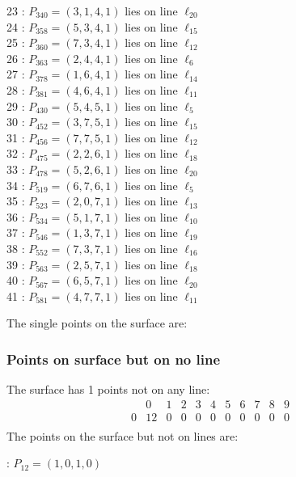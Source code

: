 \documentclass{article}
\begin{document}
{\begin{multicols}{2}
23 : $P_{340}=( 3, 1, 4, 1 )$ lies on line $\ell_{20}$\\
24 : $P_{358}=( 5, 3, 4, 1 )$ lies on line $\ell_{15}$\\
25 : $P_{360}=( 7, 3, 4, 1 )$ lies on line $\ell_{12}$\\
26 : $P_{363}=( 2, 4, 4, 1 )$ lies on line $\ell_{6}$\\
27 : $P_{378}=( 1, 6, 4, 1 )$ lies on line $\ell_{14}$\\
28 : $P_{381}=( 4, 6, 4, 1 )$ lies on line $\ell_{11}$\\
29 : $P_{430}=( 5, 4, 5, 1 )$ lies on line $\ell_{5}$\\
30 : $P_{452}=( 3, 7, 5, 1 )$ lies on line $\ell_{15}$\\
31 : $P_{456}=( 7, 7, 5, 1 )$ lies on line $\ell_{12}$\\
32 : $P_{475}=( 2, 2, 6, 1 )$ lies on line $\ell_{18}$\\
33 : $P_{478}=( 5, 2, 6, 1 )$ lies on line $\ell_{20}$\\
34 : $P_{519}=( 6, 7, 6, 1 )$ lies on line $\ell_{5}$\\
35 : $P_{523}=( 2, 0, 7, 1 )$ lies on line $\ell_{13}$\\
36 : $P_{534}=( 5, 1, 7, 1 )$ lies on line $\ell_{10}$\\
37 : $P_{546}=( 1, 3, 7, 1 )$ lies on line $\ell_{19}$\\
38 : $P_{552}=( 7, 3, 7, 1 )$ lies on line $\ell_{16}$\\
39 : $P_{563}=( 2, 5, 7, 1 )$ lies on line $\ell_{18}$\\
40 : $P_{567}=( 6, 5, 7, 1 )$ lies on line $\ell_{20}$\\
41 : $P_{581}=( 4, 7, 7, 1 )$ lies on line $\ell_{11}$\\
\end{multicols}
The single points on the surface are:\\
\subsubsection*{Points on surface but on no line}
The surface has 1 points not on any line:\\
$$
\begin{array}{r|*{10}{r}}
 & 0 & 1 & 2 & 3 & 4 & 5 & 6 & 7 & 8 & 9\\
\hline
0 & 12 & 0 & 0 & 0 & 0 & 0 & 0 & 0 & 0 & 0\\
\end{array}
$$
The points on the surface but not on lines are:\\
\begin{multicols}{2}
 : $P_{12}=( 1, 0, 1, 0 )$\\
\end{multicols}
}
\end{document}
